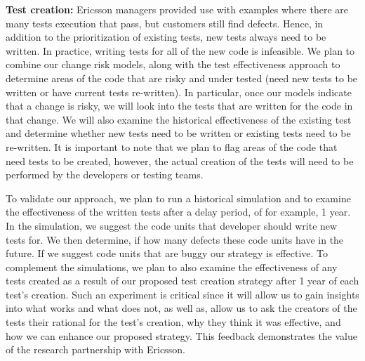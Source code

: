 \textbf{Test creation:} Ericsson managers provided use with examples where there are many tests execution that pass, but customers still find defects. Hence, in addition to the prioritization of existing tests, new tests always need to be written. In practice, writing tests for all of the new code is infeasible. We plan to combine our change risk models, along with the test effectiveness approach to determine areas of the code that are risky and under tested (\ie need new tests to be written or have current tests re-written). In particular, once our models indicate that a change is risky, we will look into the tests that are written for the code in that change. We will also examine the historical effectiveness of the existing test and determine whether new tests need to be written or existing tests need to be re-written. It is important to note that we plan to flag areas of the code that need tests to be created, however, the actual creation of the tests will need to be performed by the developers or testing teams.

To validate our approach, we plan to run a historical simulation and to examine the effectiveness of the written tests after a delay period, of for example, 1 year. In the simulation, we suggest the code units that developer should write new tests for. We then determine, if how many defects these code units have in the future. If we suggest code units that are buggy our strategy is effective. To complement the simulations, we plan to also examine the effectiveness of any tests created as a result of our proposed test creation strategy after 1 year of each test's creation. Such an experiment is critical since it will allow us to gain insights into what works and what does not, as well as, allow us to ask the creators of the tests their rational for the test's creation, why they think it was effective, and how we can enhance our proposed strategy. This feedback demonstrates the value of the research partnership with Ericsson. 



